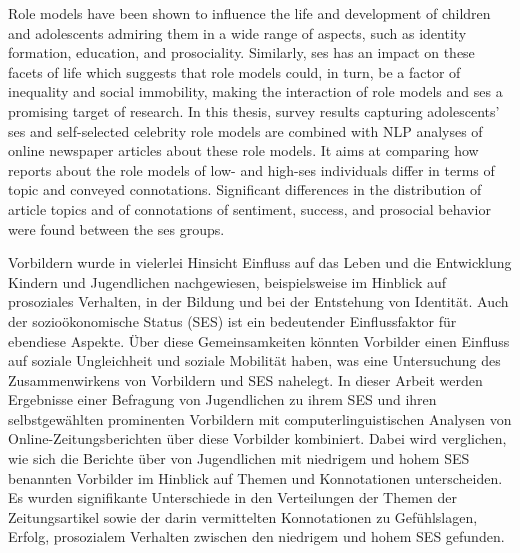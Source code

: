 Role models have been shown to influence the life and development of children and adolescents admiring them in a wide range of aspects, such as identity formation, education, and prosociality. Similarly, \gls{ses} has an impact on these facets of life which suggests that role models could, in turn, be a factor of inequality and social immobility, making the interaction of role models and \gls{ses} a promising target of research. In this thesis, survey results capturing adolescents' \gls{ses} and self-selected celebrity role models are combined with NLP analyses of online newspaper articles about these role models. It aims at comparing how reports about the role models of low- and high-\gls{ses} individuals differ in terms of topic and conveyed connotations. Significant differences in the distribution of article topics and of connotations of sentiment, success, and prosocial behavior were found between the \gls{ses} groups.

\vspace{2cm}
Vorbildern wurde in vielerlei Hinsicht Einfluss auf das Leben und die Entwicklung Kindern und Jugendlichen nachgewiesen, beispielsweise im Hinblick auf prosoziales Verhalten, in der Bildung und bei der Entstehung von Identität. Auch der sozioökonomische Status (SES) ist ein bedeutender Einflussfaktor für ebendiese Aspekte. Über diese Gemeinsamkeiten könnten Vorbilder einen Einfluss auf soziale Ungleichheit und soziale Mobilität haben, was eine Untersuchung des Zusammenwirkens von Vorbildern und SES nahelegt. In dieser Arbeit werden Ergebnisse einer Befragung von Jugendlichen zu ihrem SES und ihren selbstgewählten prominenten Vorbildern mit computerlinguistischen Analysen von Online-Zeitungsberichten über diese Vorbilder kombiniert. Dabei wird verglichen, wie sich die Berichte über von Jugendlichen mit niedrigem und hohem SES benannten Vorbilder im Hinblick auf Themen und Konnotationen unterscheiden. Es wurden signifikante Unterschiede in den Verteilungen der Themen der Zeitungsartikel sowie der darin vermittelten Konnotationen zu Gefühlslagen, Erfolg, prosozialem Verhalten zwischen den niedrigem und hohem SES gefunden.

\glsresetall